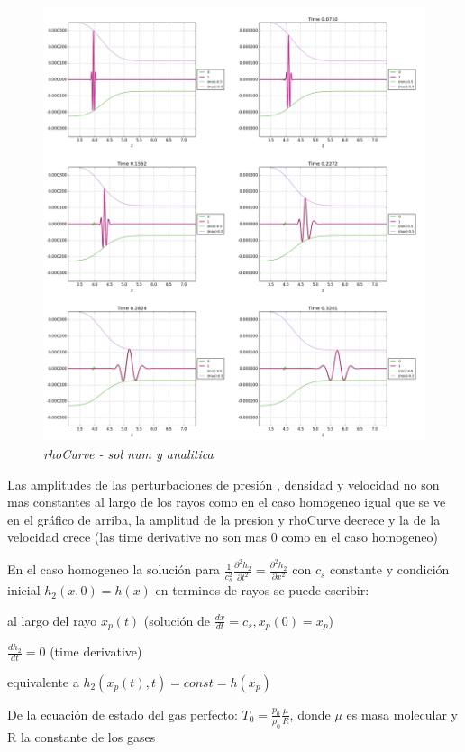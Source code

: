 \documentclass{article}
\begin{document}
\begin{description}
\item \begin{figure}[!ht]
 \centering
 \includegraphics[scale=0.2]{rhocinhom1.png}
 \caption{\emph{rhoCurve - sol num y analitica}}
\end{figure}

\item Las amplitudes de las perturbaciones de presión , densidad y velocidad  no son mas constantes al largo de los rayos como en el caso homogeneo igual que se ve en el gráfico de arriba, la amplitud de la presion y rhoCurve decrece y la de la velocidad crece (las time derivative  no son mas 0 como en el caso homogeneo)
\item En el caso homogeneo la solución para $\frac{1}{c_s^{2}} \frac{\partial^{2} h_2}{\partial t^{2}} = \frac{ \partial^{2} h_2}{\partial x^2}   $ con $c_s$ constante  y condición inicial $h_2(x,0) = h(x)$ en terminos de rayos se puede escribir:

\begin{description}
\item al largo del rayo $x_p(t)$ (solución de $\frac{dx}{dt} = c_s, x_p(0) = x_p$) 
\item $\frac{dh_2}{dt} = 0$ (time derivative)
\item equivalente a $h_2(x_p(t), t) = const = h(x_p)$  

\end{description}

\item De la ecuación de estado del gas perfecto: $T_0 = \frac{p_0} {\rho_0} \frac{\mu}{R}$, donde $\mu$ es masa molecular y R la constante de los gases
\end{description}
\end{document}
